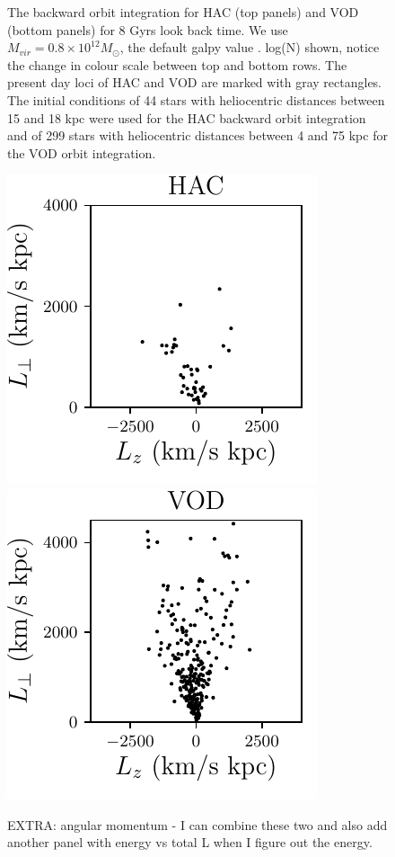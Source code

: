 \documentclass[fleqn,usenatbib]{mnras}
\begin{document}
\begin{figure}
   \caption{The backward orbit integration for HAC (top panels) and VOD (bottom panels) for 8 Gyrs look back time. We use $M_{vir} = 0.8 \times 10^{12} M_{\odot}$, the default galpy value . log(N) shown, notice the change in colour scale between top and bottom rows. The present day loci of  HAC and VOD are marked with gray rectangles. The initial conditions of 44 stars with heliocentric distances between 15 and 18 kpc were used for the HAC backward orbit integration and of 299 stars with heliocentric distances between 4 and 75 kpc for the VOD orbit integration.}
    \label{fig:backorbits}
\end{figure}
\begin{figure}
	       	       \includegraphics[scale=0.52]{HAC_Lz_Lp.pdf}
	       	       	       	       \includegraphics[scale=0.52]{VOD_Lz_Lp.pdf}
   \caption{EXTRA: angular momentum - I can combine these two and also add another panel with energy vs total L when I figure out the energy.}
    \label{fig:l}
\end{figure}
\end{document}
